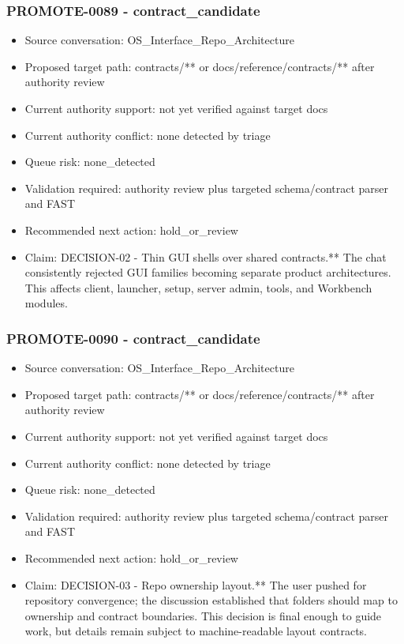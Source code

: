 \documentclass[11pt,a4paper]{report}
\begin{document}
\subsubsection{PROMOTE-0089 - contract\_candidate}

\begin{itemize}
\item Source conversation: OS\_Interface\_Repo\_Architecture
\item Proposed target path: contracts/** or docs/reference/contracts/** after authority review
\item Current authority support: not yet verified against target docs
\item Current authority conflict: none detected by triage
\item Queue risk: none\_detected
\item Validation required: authority review plus targeted schema/contract parser and FAST
\item Recommended next action: hold\_or\_review
\item Claim: DECISION-02 - Thin GUI shells over shared contracts.** The chat consistently rejected GUI families becoming separate product architectures. This affects client, launcher, setup, server admin, tools, and Workbench modules.
\end{itemize}

\subsubsection{PROMOTE-0090 - contract\_candidate}

\begin{itemize}
\item Source conversation: OS\_Interface\_Repo\_Architecture
\item Proposed target path: contracts/** or docs/reference/contracts/** after authority review
\item Current authority support: not yet verified against target docs
\item Current authority conflict: none detected by triage
\item Queue risk: none\_detected
\item Validation required: authority review plus targeted schema/contract parser and FAST
\item Recommended next action: hold\_or\_review
\item Claim: DECISION-03 - Repo ownership layout.** The user pushed for repository convergence; the discussion established that folders should map to ownership and contract boundaries. This decision is final enough to guide work, but details remain subject to machine-readable layout contracts.
\end{itemize}
\end{document}
